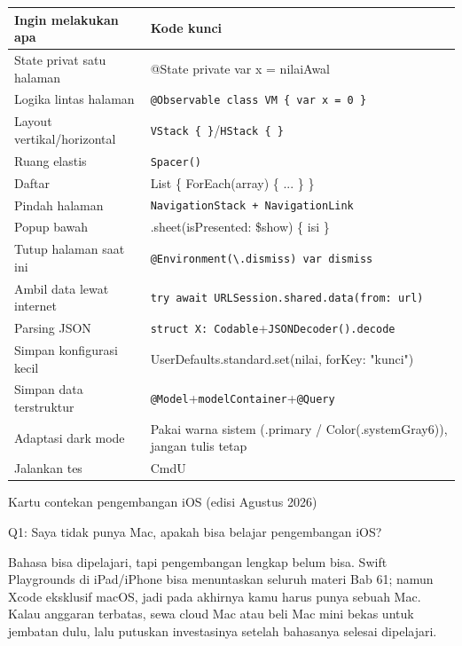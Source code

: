 


\begin{center}
\begin{tabularx}{\linewidth}{|X|X|}
\hline
\textbf{Ingin melakukan apa} & \textbf{Kode kunci} \tabularnewline
\hline
State privat satu halaman & @State private var x = nilaiAwal \tabularnewline
Logika lintas halaman & \texttt{@Observable class VM \{ var x = 0 \}} \tabularnewline
Layout vertikal/horizontal & \texttt{VStack \{ \}}/\texttt{HStack \{ \}} \tabularnewline
Ruang elastis & \texttt{Spacer()} \tabularnewline
Daftar & List \{ ForEach(array) \{ ... \} \} \tabularnewline
Pindah halaman & \texttt{NavigationStack + NavigationLink} \tabularnewline
Popup bawah & .sheet(isPresented: \$show) \{ isi \} \tabularnewline
Tutup halaman saat ini & \texttt{@Environment(\textbackslash{}.\allowbreak dismiss) var dismiss} \tabularnewline
Ambil data lewat internet & \texttt{try await URLSession.\allowbreak shared.\allowbreak data(from: url)} \tabularnewline
Parsing JSON & \texttt{struct X: Codable}+\texttt{JSONDecoder().\allowbreak decode} \tabularnewline
Simpan konfigurasi kecil & UserDefaults.standard.set(nilai, forKey: "kunci") \tabularnewline
Simpan data terstruktur & \texttt{@Model}+\texttt{modelContainer}+\texttt{@Query} \tabularnewline
Adaptasi dark mode & Pakai warna sistem (.primary / Color(.systemGray6)), jangan tulis tetap \tabularnewline
Jalankan tes & CmdU \tabularnewline
\hline
\end{tabularx}
\end{center}

\begin{center}\small\color{gray}Kartu contekan pengembangan iOS (edisi Agustus 2026)\end{center}


Q1: Saya tidak punya Mac, apakah bisa belajar pengembangan iOS?

Bahasa bisa dipelajari, tapi pengembangan lengkap belum bisa. Swift Playgrounds di iPad/iPhone bisa menuntaskan seluruh materi Bab 61; namun Xcode eksklusif macOS, jadi pada akhirnya kamu harus punya sebuah Mac. Kalau anggaran terbatas, sewa cloud Mac atau beli Mac mini bekas untuk jembatan dulu, lalu putuskan investasinya setelah bahasanya selesai dipelajari.

